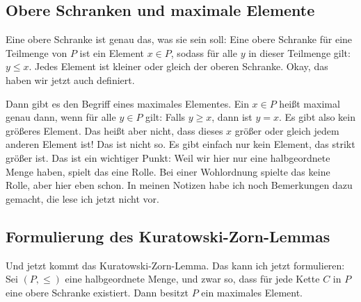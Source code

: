\subsection{Obere Schranken und maximale Elemente}

\begin{spoken-clean}[00:58:40 - 01:00:40]
Eine obere Schranke ist genau das, was sie sein soll: Eine obere Schranke für eine Teilmenge von $P$ ist ein Element $x \in P$, sodass für alle $y$ in dieser Teilmenge gilt: $y \le x$. Jedes Element ist kleiner oder gleich der oberen Schranke. Okay, das haben wir jetzt auch definiert.

Dann gibt es den Begriff eines maximales Elementes. Ein $x \in P$ heißt maximal genau dann, wenn für alle $y \in P$ gilt: Falls $y \ge x$, dann ist $y = x$. Es gibt also kein größeres Element. Das heißt aber nicht, dass dieses $x$ größer oder gleich jedem anderen Element ist! Das ist nicht so. Es gibt einfach nur kein Element, das strikt größer ist. Das ist ein wichtiger Punkt: Weil wir hier nur eine halbgeordnete Menge haben, spielt das eine Rolle. Bei einer Wohlordnung spielte das keine Rolle, aber hier eben schon. In meinen Notizen habe ich noch Bemerkungen dazu gemacht, die lese ich jetzt nicht vor.
\end{spoken-clean}

\begin{math-stroke}

\end{math-stroke}

\subsection{Formulierung des Kuratowski-Zorn-Lemmas}

\begin{spoken-clean}[01:00:40 - 01:02:40]
Und jetzt kommt das Kuratowski-Zorn-Lemma. Das kann ich jetzt formulieren: Sei $(P, \le)$ eine halbgeordnete Menge, und zwar so, dass für jede Kette $C$ in $P$ eine obere Schranke existiert. Dann besitzt $P$ ein maximales Element.
\end{spoken-clean}

